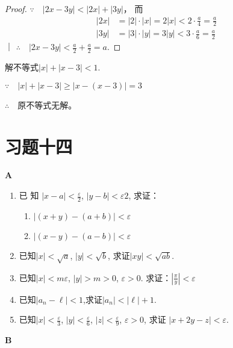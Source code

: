 \begin{proof}
$\because\quad |2x-3y|<|2x|+|3y| $，
而
\[\begin{split}
   | 2x|&=|2|\cdot |x|=2|x|<2\cdot \frac{a}{4}=\frac{a}{2}\\
    |3y|&=|3|\cdot |y|=3|y|<3\cdot \frac{a}{6}=\frac{a}{2}
\end{split}\]｜
$\therefore\quad |2x-3y|<\frac{a}{2}+\frac{a}{2}=a$.


\end{proof}

\begin{example}
    解不等式$|x|+|x-3|<1$.
\end{example}
 
\begin{solution}
$\because\quad |x|+|x-3|\ge |x-(x-3)|=3$

$\therefore\quad $原不等式无解。
\end{solution}


\section*{习题十四}
\begin{center}
    \bfseries A
\end{center}
\begin{enumerate}
    \item  已 知 $| x- a| < \frac{\varepsilon}{2}$, $| y- b| <{\varepsilon}{2}$, 求证：
\begin{enumerate}[(1)]
    \item $|(x+y)-(a+b)|<\varepsilon$
    \item $|(x-y)-(a-b)|<\varepsilon$
\end{enumerate}

\item  已知$|x|<\sqrt a$, $|y|<\sqrt b$, 求证$|xy|<\sqrt{ab}.$
\item 已知$|x|<m\varepsilon$, $|y|>m>0$, $\varepsilon>0$. 
求证：$\left|\frac\pi y\right|<\varepsilon$
\item  已知$|a_n-\ell|<1$,求证$|a_n|<|\ell|+1.$

\item 已知$|x|<\frac\varepsilon3$, $|y|<\frac\varepsilon6$, $|z|<\frac\varepsilon9$, $\varepsilon>0$, 求证
$|x+2y-z|<\varepsilon$.
\end{enumerate}


\begin{center}
    \bfseries B
\end{center}

